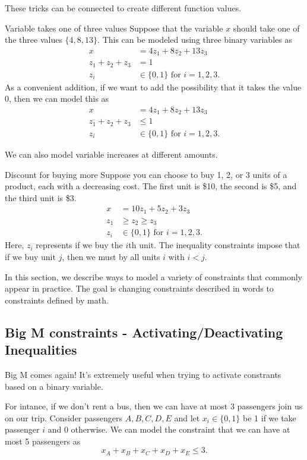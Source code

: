 These tricks can be connected to create different function values.  

\begin{example}{Variable takes one of three values}{}
Suppose that the variable $x$ should take one of the three values $\{4, 8, 13\}$. This can be modeled using three binary variables as
\begin{align*}
x &= 4z_1 +8z_2 +13z_3\\
z_1 +z_2 +z_3 &= 1\\
z_i &\in \{0, 1\} \text{ for } i = 1, 2,3.
\end{align*}
As a convenient addition, if we want to add the possibility that it takes the value $0$, then we can model this as 
\begin{align*}
x &= 4z_1 +8z_2 +13z_3\\
z_1 +z_2 +z_3 &\leq 1\\
z_i &\in \{0, 1\} \text{ for } i = 1, 2,3.
\end{align*}
\end{example}

We can also model variable increases at different amounts.  \begin{example}{Discount for buying more}{}
Suppose you can choose to buy 1, 2, or 3 units of a product, each with a decreasing cost.  The first unit is \$10, the second is \$5, and the third unit is \$3.
\begin{align*}
x &= 10z_1 +5z_2 +3z_3\\
z_1 &\geq z_2 \geq z_3\\
z_i &\in \{0, 1\} \text{ for } i = 1, 2,3.
\end{align*}
Here, $z_i$ represents if we buy the $i$th unit.  The inequality constraints impose that if we buy unit $j$, then we must by all units $i$ with $i < j$.
\end{example}

In this section, we describe ways to model a variety of constraints that commonly appear in practice.  The goal is changing constraints described in words to constraints defined by math.
\subsection{Big M constraints - Activating/Deactivating Inequalities}
Big M comes again!   It's extremely useful when trying to activate constrants based on a binary variable.

For intance, if we don't rent a bus, then we can have at most 3 passengers join us on our trip.   Consider passengers $A,B,C,D,E$ and let $x_i \in \{0,1\}$ be 1 if we take passenger $i$ and 0 otherwise.
We can model the constraint that we can have at most 5 passengers as 
$$
x_A + x_B + x_C + x_D + x_E \leq 3.
$$

